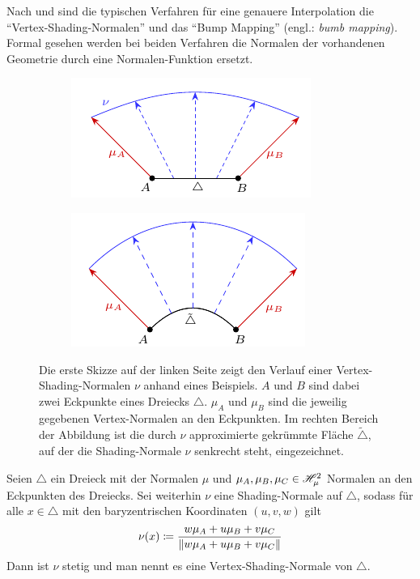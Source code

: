 		Nach \cite[S.~166,~584~ff]{pbrt3} und \cite[S.~38~ff,~183~ff]{real-time-render} sind die typischen Verfahren für eine genauere Interpolation die \enquote{Vertex-Shading-Normalen} und das \enquote{Bump Mapping} (engl.: \textit{bumb mapping}).
		Formal gesehen werden bei beiden Verfahren die Normalen der vorhandenen Geometrie durch eine Normalen-Funktion ersetzt.
		\begin{figure}[h]
			\begin{subfigure}[b]{0.5\textwidth}
				\center
				\includegraphics{gg_fig/scheme_normal-function_1.pdf}
			\end{subfigure}
			\begin{subfigure}[b]{0.5\textwidth}
				\center
				\includegraphics{gg_fig/scheme_normal-function_2.pdf}
			\end{subfigure}
			\caption[Beispiel des Verlaufs einer Vertex-Shading-Normalen]{Die erste Skizze auf der linken Seite zeigt den Verlauf einer Vertex-Shading-Normalen $\nu$ anhand eines Beispiels. $A$ und $B$ sind dabei zwei Eckpunkte eines Dreiecks $\triangle$. $\mu_A$ und $\mu_B$ sind die jeweilig gegebenen Vertex-Normalen an den Eckpunkten. Im rechten Bereich der Abbildung ist die durch $\nu$ approximierte gekrümmte Fläche $\tilde{\triangle}$, auf der die Shading-Normale $\nu$ senkrecht steht, eingezeichnet.}
			\label{fig:normal-function}
		\end{figure}

		\begin{definition}
			Seien $\triangle$ ein Dreieck mit der Normalen $\mu$ und $\mu_A, \mu_B, \mu_C \in \mathscr{H}^{2}_{\mu}$ Normalen an den Eckpunkten des Dreiecks.
			Sei weiterhin $\nu$ eine Shading-Normale auf $\triangle$, sodass für alle $x\in \triangle$ mit den baryzentrischen Koordinaten $(u,v,w)$ gilt
			\[
				\nu(x) \coloneqq \frac{w\mu_A + u\mu_B + v\mu_C}{\left\| w\mu_A + u\mu_B + v\mu_C \right\|}
			\]
			Dann ist $\nu$ stetig und man nennt es eine Vertex-Shading-Normale von $\triangle$.
		\end{definition}

